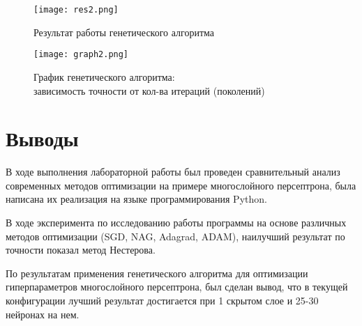 \documentclass[a4paper, 14pt]{extarticle}
\begin{document}
\begin{figure}[!h]
    \centering
    \texttt{[image: res2.png]}
    \caption{Результат работы генетического алгоритма}
    \label{fig:enter-label7}
\end{figure}

\begin{figure}[h]
    \centering
    \texttt{[image: graph2.png]}
    \caption{График генетического алгоритма:\\ зависимость точности от кол-ва итераций (поколений)}
    \label{fig:enter-label8}
\end{figure}

\section{Выводы}\label{Sect::sum}
В ходе выполнения лабораторной работы был проведен сравнительный анализ современных методов
оптимизации на примере многослойного персептрона, была написана их реализация на языке программирования Python. 

В ходе эксперимента по исследованию работы программы на основе различных методов оптимизации (SGD, NAG, Adagrad, ADAM), наилучший результат по точности показал метод Нестерова.

По результатам применения генетического алгоритма для оптимизации гиперпараметров многослойного персептрона, был сделан вывод, что в текущей конфигурации лучший результат достигается при 1 скрытом слое и 25-30 нейронах на нем.
\end{document}

